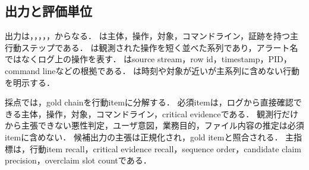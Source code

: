\subsection{出力と評価単位}

出力は，，，，，からなる．
は主体，操作，対象，コマンドライン，証跡を持つ主行動ステップである．
は観測された操作を短く並べた系列であり，アラート名ではなくログ上の操作を表す．
はsource stream，row id，timestamp，PID，command lineなどの根拠である．
は時刻や対象が近いが主系列に含めない行動を明示する．

採点では，gold chainを行動itemに分解する．
必須itemは，ログから直接確認できる主体，操作，対象，コマンドライン，critical evidenceである．
観測行だけから主張できない悪性判定，ユーザ意図，業務目的，ファイル内容の推定は必須itemに含めない．
候補出力の主張は正規化され，gold itemと照合される．
主指標は，行動item recall，critical evidence recall，sequence order，candidate claim precision，overclaim slot countである．


